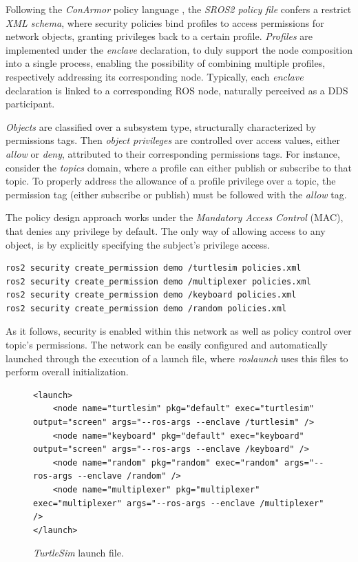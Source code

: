Following the \textit{ConArmor} policy language \cite{white2018procedurally}, the \textit{SROS2 policy file} confers a restrict \textit{XML schema}, where security policies bind profiles to access permissions for network objects, granting privileges back to a certain profile. \textit{Profiles} are implemented under the \textit{enclave} declaration, to duly support the node composition into a single process, enabling the possibility of combining multiple profiles, respectively addressing its corresponding node. Typically, each \textit{enclave} declaration is linked to a corresponding ROS node, naturally perceived as a DDS participant.

\textit{Objects} are classified over a subsystem type, structurally characterized by permissions tags. Then \textit{object privileges} are controlled over access values, either \textit{allow} or \textit{deny}, attributed to their corresponding permissions tags. For instance, consider the \textit{topics} domain, where a profile can either publish or subscribe to that topic. To properly address the allowance of a profile privilege over a topic, the permission tag (either subscribe or publish) must be followed with the \textit{allow} tag. \cite{ros-access-control}

The policy design approach works under the \textit{Mandatory Access Control} (MAC), that denies any privilege by default. The only way of allowing access to any object, is by explicitly specifying the subject's privilege access. \cite{ros-access-control, white2018procedurally}

\begin{lstlisting}[title={Setting permissions into each enclave.}]
ros2 security create_permission demo /turtlesim policies.xml
ros2 security create_permission demo /multiplexer policies.xml
ros2 security create_permission demo /keyboard policies.xml
ros2 security create_permission demo /random policies.xml
\end{lstlisting}

As it follows, security is enabled within this network as well as policy control over topic's permissions. The network can be easily configured and automatically launched through the execution of a launch file, where \textit{roslaunch} uses this files to perform overall initialization.

\begin{figure}[H]
\begin{lstlisting}
<launch>
    <node name="turtlesim" pkg="default" exec="turtlesim" output="screen" args="--ros-args --enclave /turtlesim" />
    <node name="keyboard" pkg="default" exec="keyboard" output="screen" args="--ros-args --enclave /keyboard" />
    <node name="random" pkg="random" exec="random" args="--ros-args --enclave /random" />
    <node name="multiplexer" pkg="multiplexer" exec="multiplexer" args="--ros-args --enclave /multiplexer" />
</launch>
\end{lstlisting}
\caption{\textit{TurtleSim} launch file.}
\label{fig:ros-lf}
\end{figure}

